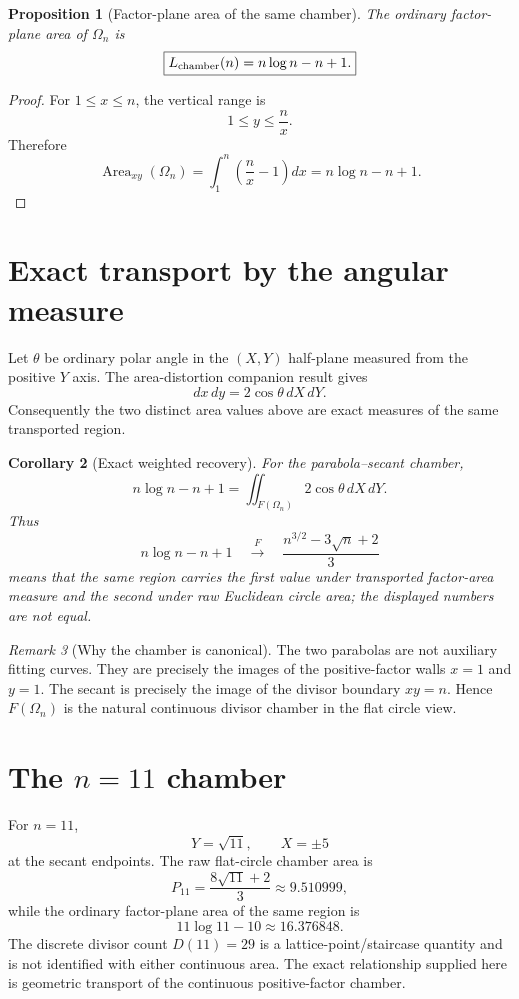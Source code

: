 \documentclass[11pt]{amsart}
\newtheorem{proposition}{Proposition}
\newtheorem{corollary}[proposition]{Corollary}
\theoremstyle{remark}
\newtheorem{remark}[proposition]{Remark}
\begin{document}
\begin{proposition}[Factor-plane area of the same chamber]\label{prop:factorchamber}
The ordinary factor-plane area of $\Omega_n$ is
\[
\boxed{
L_{\rm chamber}(n)
= n\log n-n+1.}
\]
\end{proposition}

\begin{proof}
For $1\le x\le n$, the vertical range is
\[
1\le y\le\frac{n}{x}.
\]
Therefore
\[
\operatorname{Area}_{xy}(\Omega_n)
=\int_1^n\left(\frac nx-1\right)dx
=n\log n-n+1.
\]
\end{proof}

\section{Exact transport by the angular measure}
Let $\theta$ be ordinary polar angle in the $(X,Y)$ half-plane measured from the positive $Y$ axis. The area-distortion companion result gives
\[
dx\,dy=2\cos\theta\,dX\,dY.
\]
Consequently the two distinct area values above are exact measures of the same transported region.

\begin{corollary}[Exact weighted recovery]\label{cor:weighted}
For the parabola--secant chamber,
\[
\boxed{
 n\log n-n+1
=\iint_{F(\Omega_n)}2\cos\theta\,dX\,dY.}
\]
Thus
\[
\boxed{
 n\log n-n+1
\quad\xrightarrow{F}\quad
\frac{n^{3/2}-3\sqrt n+2}{3}}
\]
means that the same region carries the first value under transported factor-area measure and the second under raw Euclidean circle area; the displayed numbers are not equal.
\end{corollary}

\begin{remark}[Why the chamber is canonical]
The two parabolas are not auxiliary fitting curves. They are precisely the images of the positive-factor walls $x=1$ and $y=1$. The secant is precisely the image of the divisor boundary $xy=n$. Hence $F(\Omega_n)$ is the natural continuous divisor chamber in the flat circle view.
\end{remark}

\section{The $n=11$ chamber}
For $n=11$,
\[
Y=\sqrt{11},\qquad X=\pm5
\]
at the secant endpoints. The raw flat-circle chamber area is
\[
\boxed{
P_{11}=\frac{8\sqrt{11}+2}{3}\approx9.510999,}
\]
while the ordinary factor-plane area of the same region is
\[
\boxed{
11\log11-10\approx16.376848.}
\]
The discrete divisor count $D(11)=29$ is a lattice-point/staircase quantity and is not identified with either continuous area. The exact relationship supplied here is geometric transport of the continuous positive-factor chamber.
\end{document}

